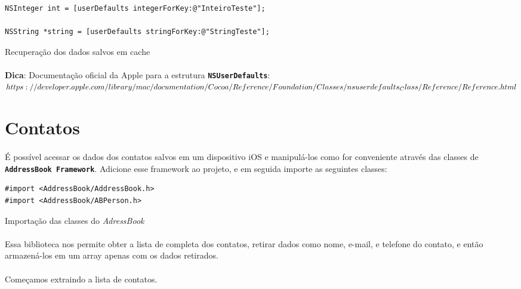 \documentclass[a4paper,12pt,brazil,doubleside]{book}
\begin{document}
\begin{singlespace}
\begin{listing}[H]
\begin{verbatim}
NSInteger int = [userDefaults integerForKey:@"InteiroTeste"];

NSString *string = [userDefaults stringForKey:@"StringTeste"];
\end{verbatim}
\caption{Recuperação dos dados salvos em cache}
\end{listing}

\bigskip

\begin{framed}
\paragraph{}\textbf{Dica}: Documentação oficial da Apple para a estrutura \texttt{\textbf{NSUserDefaults}}:\\
\(https://developer.apple.com/library/mac/documentation/Cocoa/Reference\\/Foundation/Classes/nsuserdefaults_Class/Reference/Reference.html
\)
\end{framed}


\section{Contatos}

\paragraph{}É possível acessar os dados dos contatos salvos em um dispositivo iOS e manipulá-los como for conveniente através das classes de \texttt{\textbf{AddressBook Framework}}. Adicione esse framework ao projeto, e em seguida importe as seguintes classes:

\begin{listing}[H]
\begin{verbatim}
#import <AddressBook/AddressBook.h>
#import <AddressBook/ABPerson.h>
\end{verbatim}
\caption{Importação das classes do \emph{AdressBook}}
\end{listing}

\paragraph{}Essa biblioteca nos permite obter a lista de completa dos contatos, retirar dados como nome, e-mail, e telefone do contato, e então armazená-los em um array apenas com os dados retirados.
\paragraph{}Começamos extraindo a lista de contatos.


\end{singlespace}
\end{document}
